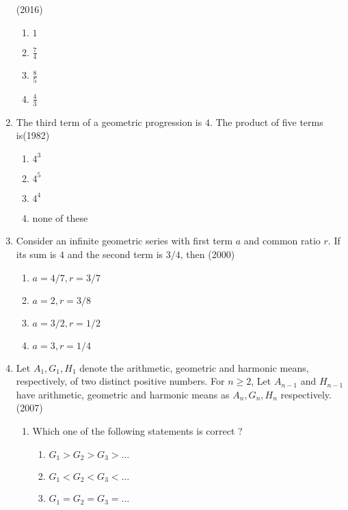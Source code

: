 \begin{enumerate}[label=\thesubsection.\arabic*,ref=\thesubsection.\theenumi]
    \hfill(2016)
    \begin{multicols}{4}
\begin{enumerate}    
    \item $1$
    \item $\frac{7}{4}$
    \item $\frac{8}{5}$
    \item $\frac{4}{3}$
    \end{enumerate}
\end{multicols}
%    
	\item  The third term of a geometric progression is $4$. The product of five terms is\hfill{(1982)}
\begin{multicols}{4}
\begin{enumerate}    
     \item${4^3}$ 
    \item${4^5}$
    \item${4^4}$
    \item none of these
\end{enumerate}
\end{multicols}
\item Consider an infinite geometric series with first term $a$ and common ratio $r$. If its sum is $4$ and the second term is $3/4$,  then \hfill (2000)
        \begin{multicols}{4}
\begin{enumerate}    
            \item $a=4/7, r=3/7$
            \item $a=2, r=3/8$
            \item $a=3/2, r=1/2$
            \item $a=3, r=1/4$
            \end{enumerate}
            \end{multicols}
\item[]  
%
Let $A_{1},  G_{1},  H_{1} $ denote the arithmetic,  geometric and harmonic means,  respectively,  of two distinct positive numbers. For $n\geq 2$,  Let $A_{n-1}$ and $H_{n-1}$ have arithmetic,  geometric and harmonic means as $A_{n}, G_{n}, H_{n}$ respectively. \hfill(2007)
\begin{enumerate}    
%      
%  
 \item Which one of the following statements is correct ?
\begin{enumerate}    
%
% 
	\item$G_{1}>G_{2}>G_{3}>\dots$ 
%
 \item$G_{1}<G_{2}<G_{3}<\dots$
%
\item$G_{1}=G_{2}=G_{3}=\dots$

\end{enumerate}
\end{enumerate}
\end{enumerate}
